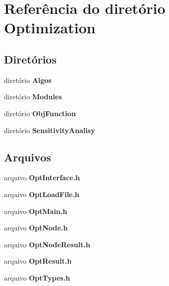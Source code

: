 \section{Referência do diretório Optimization}
\label{dir_976444ffbcd0cf7e59138d237483c157}
\subsection*{Diretórios}
\begin{DoxyCompactItemize}
\item 
diretório {\bf Algos}
\item 
diretório {\bf Modules}
\item 
diretório {\bf Obj\+Function}
\item 
diretório {\bf Sensitivity\+Analisy}
\end{DoxyCompactItemize}
\subsection*{Arquivos}
\begin{DoxyCompactItemize}
\item 
arquivo {\bf Opt\+Interface.\+h}
\item 
arquivo {\bf Opt\+Load\+File.\+h}
\item 
arquivo {\bf Opt\+Main.\+h}
\item 
arquivo {\bf Opt\+Node.\+h}
\item 
arquivo {\bf Opt\+Node\+Result.\+h}
\item 
arquivo {\bf Opt\+Result.\+h}
\item 
arquivo {\bf Opt\+Types.\+h}
\end{DoxyCompactItemize}
